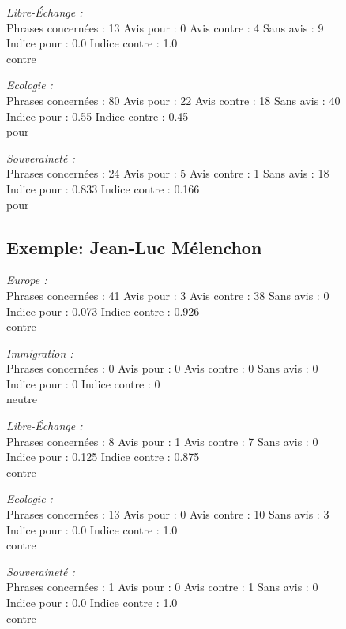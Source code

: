 \documentclass{article}
\begin{document}
\emph{Libre-Échange :}\\
Phrases concernées : 13
Avis pour : 0
Avis contre : 4
Sans avis : 9\\
Indice pour : 0.0
Indice contre : 1.0
\\
contre

\emph{Ecologie : }\\
Phrases concernées : 80
Avis pour : 22
Avis contre : 18
Sans avis : 40\\
Indice pour : 0.55
Indice contre : 0.45
\\pour

\emph{Souveraineté : }\\
Phrases concernées : 24
Avis pour : 5
Avis contre : 1
Sans avis : 18\\
Indice pour : 0.833
Indice contre : 0.166
\\pour

\subsection{Exemple: Jean-Luc Mélenchon }

\emph{Europe :} \\
Phrases concernées : 41
Avis pour : 3
Avis contre : 38
Sans avis : 0\\
Indice pour : 0.073
Indice contre : 0.926
\\contre

\emph{Immigration : }\\
Phrases concernées : 0
Avis pour : 0
Avis contre : 0
Sans avis : 0\\
Indice pour : 0
Indice contre : 0
\\neutre

\emph{Libre-Échange : }\\
Phrases concernées : 8
Avis pour : 1
Avis contre : 7
Sans avis : 0\\
Indice pour : 0.125
Indice contre : 0.875
\\contre

\emph{Ecologie : }\\
Phrases concernées : 13
Avis pour : 0
Avis contre : 10
Sans avis : 3\\
Indice pour : 0.0
Indice contre : 1.0
\\contre

\emph{Souveraineté : }\\
Phrases concernées : 1
Avis pour : 0
Avis contre : 1
Sans avis : 0\\
Indice pour : 0.0
Indice contre : 1.0
\\contre
\end{document}

